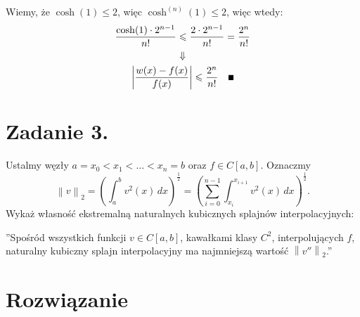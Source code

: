 \documentclass[a4paper]{article}
\renewcommand{\le}{\leqslant} %
\renewcommand\qedsymbol{\scalebox{0.75}{$\blacksquare$}} %
\begin{document}
      Wiemy, że $\cosh(1) \le 2$, więc $\cosh^{(n)}(1) \le 2$, więc wtedy:
      \begin{gather*}
         \frac{\cosh(1) \cdot 2^{n-1}}{n!} \le
         \frac{2 \cdot 2^{n-1}}{n!} =
         \frac{2^{n}}{n!} \\
         \Downarrow \\
         \left| \frac{w(x) - f(x)}{f(x)} \right| \le \frac{2^{n}}{n!} \quad
         \qedsymbol
      \end{gather*}


   \section*{Zadanie 3.}

      Ustalmy węzły $a = x_{0} < x_{1} < \dots < x_{n} = b$ oraz $f \in C[a, b]$.
      Oznaczmy
      \[
         \left\| v \right\|_{2} =
         \left( \int_{a}^{b} v^2(x) \, dx \right)^{\frac{1}{2}} =
         \left( \sum_{i = 0}^{n-1} \int_{x_i}^{x_{i+1}} v^{2}(x) \, dx \right)^{\frac{1}{2}}.
      \]
      Wykaż własność ekstremalną naturalnych kubicznych splajnów interpolacyjnych:

      ''Spośród wszystkich funkcji $v \in C[a, b]$, kawałkami klasy $C^{2}$,
      interpolujących $f$, naturalny kubiczny splajn interpolacyjny ma najmniejszą wartość
      $\left\| v'' \right\|_{2}$.''


   \section*{\large Rozwiązanie}
\end{document}
